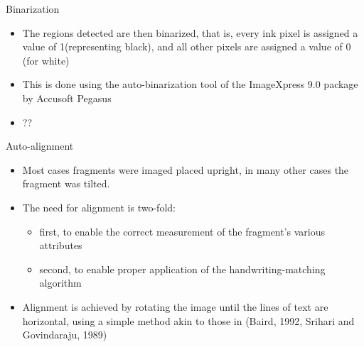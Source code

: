 \documentclass[12pt]{beamer}
\begin{document}
\begin{frame}{Binarization}
\begin{itemize}
\item The regions detected are then binarized, that is, every ink pixel is assigned a value of 1(representing black), and all other pixels are assigned a value of 0 (for white)
\item This is done using the auto-binarization tool of the ImageXpress 9.0 package by Accusoft Pegasus
\item ??
\end{itemize}
\end{frame}

\begin{frame}{Auto-alignment}
\begin{itemize}
\item Most cases fragments were imaged placed upright, in many other cases the fragment was tilted.
\item The need for alignment is two-fold:
\begin{itemize}
\item first, to enable the correct measurement of the fragment’s various attributes
\item second, to enable proper application of the handwriting-matching algorithm
\end{itemize}
\item Alignment is achieved by rotating the image until the lines of text are horizontal, using a simple method akin to those in (Baird, 1992, Srihari and Govindaraju, 1989)
\end{itemize}
\end{frame}
\end{document}
